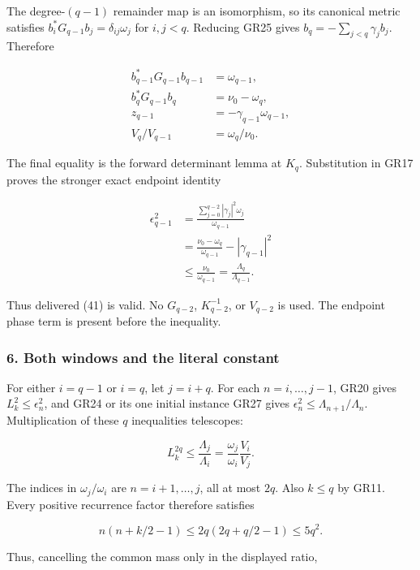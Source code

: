 \documentclass{article}
\begin{document}
The degree-\((q-1)\) remainder map is an isomorphism, so its canonical metric satisfies \(b_i^*G_{q-1}b_j=\delta_{ij}\omega_j\) for \(i,j<q\). Reducing GR25 gives \(b_q=-\sum_{j<q}\gamma_jb_j\). Therefore

\[
\begin{aligned}
b_{q-1}^*G_{q-1}b_{q-1}&=\omega_{q-1},\\
b_q^*G_{q-1}b_q&=\nu_0-\omega_q,\\
z_{q-1}&=-\gamma_{q-1}\omega_{q-1},\\
V_q/V_{q-1}&=\omega_q/\nu_0.
\end{aligned}
\tag{GR26}
\]

The final equality is the forward determinant lemma at \(K_q\). Substitution in GR17 proves the stronger exact endpoint identity

\[
\begin{aligned}
\epsilon_{q-1}^2
&=\frac{\sum_{j=0}^{q-2}|\gamma_j|^2\omega_j}{\omega_{q-1}}\\
&=\frac{\nu_0-\omega_q}{\omega_{q-1}}-|\gamma_{q-1}|^2\\
&\le\frac{\nu_0}{\omega_{q-1}}
=\frac{\Lambda_q}{\Lambda_{q-1}}.
\end{aligned}
\tag{GR27}
\]

Thus delivered (41) is valid. No \(G_{q-2}\), \(K_{q-2}^{-1}\), or \(V_{q-2}\) is used. The endpoint phase term is present before the inequality.

\subsubsection{6. Both windows and the literal constant}\label{endpoint-gamma_review--both-windows-and-the-literal-constant}

For either \(i=q-1\) or \(i=q\), let \(j=i+q\). For each \(n=i,\ldots,j-1\), GR20 gives \(L_k^2\le\epsilon_n^2\), and GR24 or its one initial instance GR27 gives \(\epsilon_n^2\le\Lambda_{n+1}/\Lambda_n\). Multiplication of these \(q\) inequalities telescopes:

\[
L_k^{2q}\le\frac{\Lambda_j}{\Lambda_i}
=\frac{\omega_j}{\omega_i}\frac{V_i}{V_j}.
\tag{GR28}
\]

The indices in \(\omega_j/\omega_i\) are \(n=i+1,\ldots,j\), all at most \(2q\). Also \(k\le q\) by GR11. Every positive recurrence factor therefore satisfies

\[
n(n+k/2-1)\le2q(2q+q/2-1)\le5q^2.
\tag{GR29}
\]

Thus, cancelling the common mass only in the displayed ratio,
\end{document}
